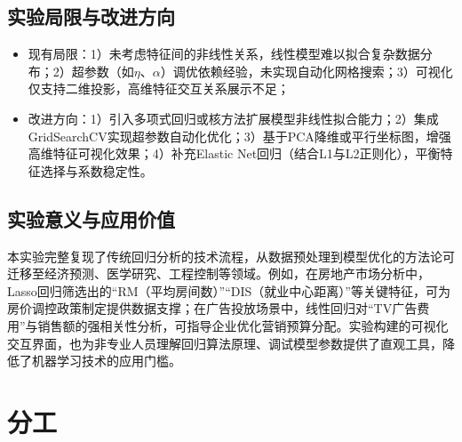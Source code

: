 \subsection{实验局限与改进方向}
\begin{itemize}
    \item {现有局限}：1）未考虑特征间的非线性关系，线性模型难以拟合复杂数据分布；2）超参数（如$\eta$、$\alpha$）调优依赖经验，未实现自动化网格搜索；3）可视化仅支持二维投影，高维特征交互关系展示不足；
    \item {改进方向}：1）引入多项式回归或核方法扩展模型非线性拟合能力；2）集成GridSearchCV实现超参数自动化优化；3）基于PCA降维或平行坐标图，增强高维特征可视化效果；4）补充Elastic Net回归（结合L1与L2正则化），平衡特征选择与系数稳定性。
\end{itemize}

\subsection{实验意义与应用价值}
本实验完整复现了传统回归分析的技术流程，从数据预处理到模型优化的方法论可迁移至经济预测、医学研究、工程控制等领域。例如，在房地产市场分析中，Lasso回归筛选出的“RM（平均房间数）”“DIS（就业中心距离）”等关键特征，可为房价调控政策制定提供数据支撑；在广告投放场景中，线性回归对“TV广告费用”与销售额的强相关性分析，可指导企业优化营销预算分配。实验构建的可视化交互界面，也为非专业人员理解回归算法原理、调试模型参数提供了直观工具，降低了机器学习技术的应用门槛。
\clearpage
\section{分工}

\begin{table}[!hpt]
\centering
\small
{}
\end{table}
